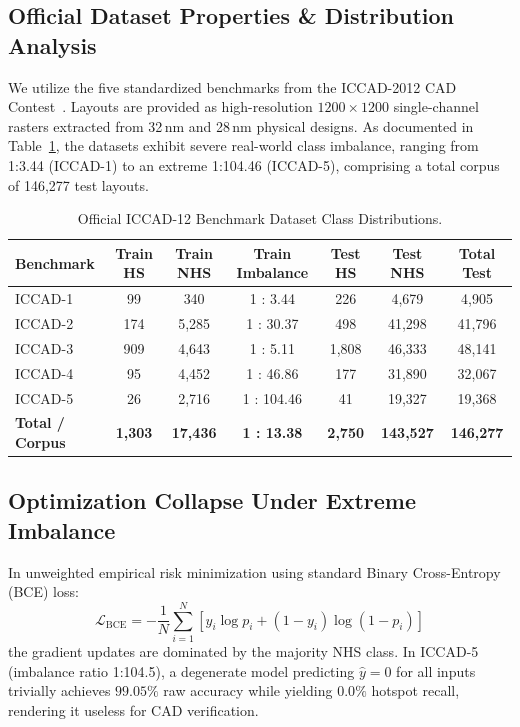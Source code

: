 \documentclass[11pt,journal,onecolumn]{IEEEtran}
\begin{document}
\subsection{Official Dataset Properties \& Distribution Analysis}
We utilize the five standardized benchmarks from the ICCAD-2012 CAD Contest~\cite{torres2012iccad}. Layouts are provided as high-resolution $1200 \times 1200$ single-channel rasters extracted from 32\,nm and 28\,nm physical designs. As documented in Table~\ref{tab:dataset}, the datasets exhibit severe real-world class imbalance, ranging from 1:3.44 (ICCAD-1) to an extreme 1:104.46 (ICCAD-5), comprising a total corpus of 146,277 test layouts.

\begin{table}[htbp]
\caption{Official ICCAD-12 Benchmark Dataset Class Distributions.}
\label{tab:dataset}
\centering
\begin{tabular}{lcccccc}
\toprule
\textbf{Benchmark} & \textbf{Train HS} & \textbf{Train NHS} & \textbf{Train Imbalance} & \textbf{Test HS} & \textbf{Test NHS} & \textbf{Total Test} \\
\midrule
ICCAD-1 & 99 & 340 & 1 : 3.44 & 226 & 4,679 & 4,905 \\
ICCAD-2 & 174 & 5,285 & 1 : 30.37 & 498 & 41,298 & 41,796 \\
ICCAD-3 & 909 & 4,643 & 1 : 5.11 & 1,808 & 46,333 & 48,141 \\
ICCAD-4 & 95 & 4,452 & 1 : 46.86 & 177 & 31,890 & 32,067 \\
ICCAD-5 & 26 & 2,716 & 1 : 104.46 & 41 & 19,327 & 19,368 \\
\midrule
\textbf{Total / Corpus} & \textbf{1,303} & \textbf{17,436} & \textbf{1 : 13.38} & \textbf{2,750} & \textbf{143,527} & \textbf{146,277} \\
\bottomrule
\end{tabular}
\end{table}

\subsection{Optimization Collapse Under Extreme Imbalance}
In unweighted empirical risk minimization using standard Binary Cross-Entropy (BCE) loss:
\begin{equation}
\mathcal{L}_{\text{BCE}} = -\frac{1}{N} \sum_{i=1}^N \left[ y_i \log p_i + (1 - y_i) \log(1 - p_i) \right]
\end{equation}
the gradient updates are dominated by the majority NHS class. In ICCAD-5 (imbalance ratio 1:104.5), a degenerate model predicting $\hat{y}=0$ for all inputs trivially achieves $99.05\%$ raw accuracy while yielding $0.0\%$ hotspot recall, rendering it useless for CAD verification.
\end{document}
